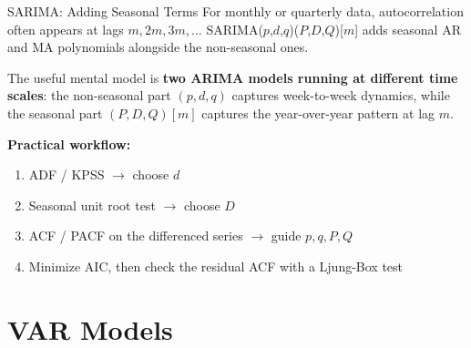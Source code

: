 \documentclass[aspectratio=169, 11pt]{beamer}
\begin{document}
\begin{frame}{SARIMA: Adding Seasonal Terms}
  For monthly or quarterly data, autocorrelation often appears at lags $m, 2m, 3m, \ldots$
  SARIMA($p$,$d$,$q$)($P$,$D$,$Q$)[$m$] adds seasonal AR and MA polynomials alongside the
  non-seasonal ones.

  \vspace{0.15cm}
  The useful mental model is \textbf{two ARIMA models running at different time scales}:
  the non-seasonal part $(p,d,q)$ captures week-to-week dynamics, while the seasonal part
  $(P,D,Q)[m]$ captures the year-over-year pattern at lag $m$.

  \vspace{0.15cm}
  \textbf{Practical workflow:}
  \begin{enumerate}\small\itemsep1pt
    \item ADF / KPSS $\to$ choose $d$
    \item Seasonal unit root test $\to$ choose $D$
    \item ACF / PACF on the differenced series $\to$ guide $p, q, P, Q$
    \item Minimize AIC, then check the residual ACF with a Ljung-Box test
  \end{enumerate}
  \vspace{0.1cm}
\end{frame}

\section{VAR Models}

\end{document}
